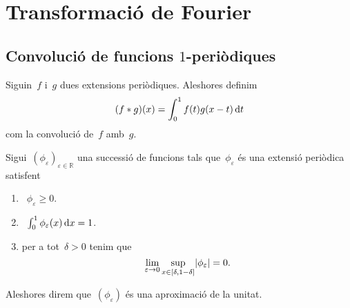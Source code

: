 \documentclass[../../main.tex]{subfiles}
\begin{document}
\section{Transformació de Fourier}
    \subsection{Convolució de funcions \ensuremath{1}-periòdiques}
    \begin{definition}
        \label{def:convolució de dues extensions periòdiques}
        Siguin~\(f\) i~\(g\) dues extensions periòdiques.
        Aleshores definim
        \[
            (f\mathbin{\ast} g)(x)=\int_{0}^{1}f(t)g(x-t)\mathop{}\!\mathrm{d} t
        \]
        com la convolució de~\(f\) amb~\(g\).
    \end{definition}
    \begin{definition}
        \label{def:aproximació de la unitat en extensions periòdiques}
        Sigui~\((\phi_{\varepsilon})_{\varepsilon\in\mathbb{R}}\) una successió de funcions tals que~\(\phi_{\varepsilon}\) és una extensió periòdica satisfent
        \begin{enumerate}
            \item~\(\phi_{\varepsilon}\geq0\).
            \item~\(\int_{0}^{1}\phi_{\varepsilon}(x)\mathop{}\!\mathrm{d} x=1\).
            \item per a tot~\(\delta>0\) tenim que
            \[
                \lim_{\varepsilon\to0}\sup_{x\in[\delta,1-\delta]}\abs{\phi_{\varepsilon}}=0.
            \]
        \end{enumerate}
        Aleshores direm que~\((\phi_{\varepsilon})\) és una aproximació de la unitat.
    \end{definition}
\end{document}
